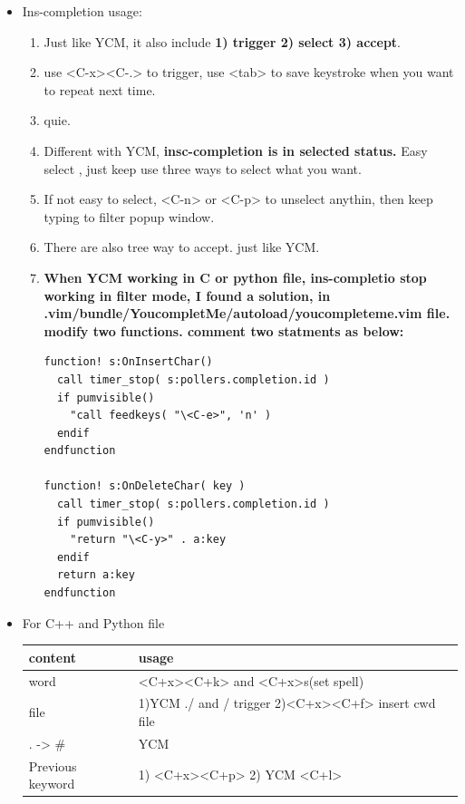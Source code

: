 \documentclass[a4paper,12pt,twoside]{book}
\begin{document}
\begin{itemize}
		\item Ins-completion usage:
				\begin{enumerate}
						\item Just like YCM, it also include \textbf{1) trigger 2) select 3) accept}.
						\item use <C-x><C-.> to trigger, use <tab> to save keystroke when you want to repeat next time.
						\item <C-e> quie.
						\item Different with YCM, \textbf{insc-completion is in selected status.} Easy select , just keep use three ways to select what you want.
						\item If not easy to select, <C-n> or <C-p> to unselect anythin, then keep typing to filter popup window. 
						\item There are also tree way to accept. just like YCM.
						\item \textbf{When YCM working in C or python file, ins-completio stop working in filter mode, I found a solution, in .vim/bundle/YoucompletMe/autoload/youcompleteme.vim file. modify two functions. comment two statments as below:}

\begin{verbatim}
function! s:OnInsertChar()
  call timer_stop( s:pollers.completion.id )
  if pumvisible()
    "call feedkeys( "\<C-e>", 'n' )
  endif
endfunction 

function! s:OnDeleteChar( key )
  call timer_stop( s:pollers.completion.id )
  if pumvisible()
    "return "\<C-y>" . a:key
  endif
  return a:key
endfunction
\end{verbatim}
				\end{enumerate}


		\item For C++ and Python file \\
		
\begin{tabular}{p{}|p{}}
\hline 
content  & usage \\ 

\hline 
word & <C+x><C+k> and <C+x>s(set spell)\\ 

\hline 
file & 1)YCM ./ and / trigger 2)<C+x><C+f> insert cwd file  \\ 

\hline 
. -> \# & YCM \\

\hline
Previous keyword & 1) <C+x><C+p> 2) YCM <C+l> \\


\end{tabular}
\end{itemize}
\end{document}
